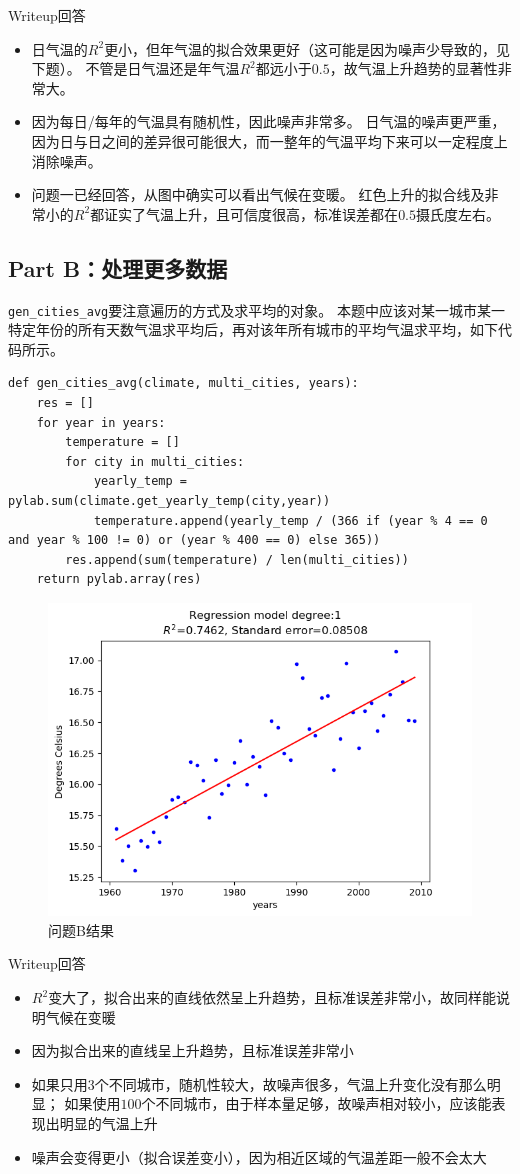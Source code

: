 \documentclass[logo,reportComp]{thesis}
\begin{document}
Writeup回答
\begin{itemize}
	\item 日气温的$R^2$更小，但年气温的拟合效果更好（这可能是因为噪声少导致的，见下题）。
	不管是日气温还是年气温$R^2$都远小于$0.5$，故气温上升趋势的显著性非常大。
	\item 因为每日/每年的气温具有随机性，因此噪声非常多。
	日气温的噪声更严重，因为日与日之间的差异很可能很大，而一整年的气温平均下来可以一定程度上消除噪声。
	\item 问题一已经回答，从图中确实可以看出气候在变暖。
	红色上升的拟合线及非常小的$R^2$都证实了气温上升，且可信度很高，标准误差都在$0.5$摄氏度左右。
\end{itemize}

\subsection*{Part B：处理更多数据}
\verb'gen_cities_avg'要注意遍历的方式及求平均的对象。
本题中应该对某一城市某一特定年份的所有天数气温求平均后，再对该年所有城市的平均气温求平均，如下代码所示。
\begin{lstlisting}
def gen_cities_avg(climate, multi_cities, years):
    res = []
    for year in years:
        temperature = []
        for city in multi_cities:
            yearly_temp = pylab.sum(climate.get_yearly_temp(city,year))
            temperature.append(yearly_temp / (366 if (year % 4 == 0 and year % 100 != 0) or (year % 400 == 0) else 365))
        res.append(sum(temperature) / len(multi_cities))
    return pylab.array(res)
\end{lstlisting}

\begin{figure}[H]
\centering
\includegraphics[width=0.6\linewidth]{fig/B.png}
\caption{问题B结果}
\end{figure}

Writeup回答
\begin{itemize}
	\item $R^2$变大了，拟合出来的直线依然呈上升趋势，且标准误差非常小，故同样能说明气候在变暖
	\item 因为拟合出来的直线呈上升趋势，且标准误差非常小
	\item 如果只用$3$个不同城市，随机性较大，故噪声很多，气温上升变化没有那么明显；
	如果使用$100$个不同城市，由于样本量足够，故噪声相对较小，应该能表现出明显的气温上升
	\item 噪声会变得更小（拟合误差变小），因为相近区域的气温差距一般不会太大
\end{itemize}
\end{document}
